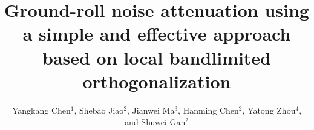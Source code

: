 \title{Ground-roll noise attenuation using a simple and effective approach based on local bandlimited orthogonalization}
\renewcommand{\thefootnote}{\fnsymbol{footnote}}
\author{Yangkang Chen$^1$, Shebao Jiao$^2$, Jianwei Ma$^3$, Hanming Chen$^2$, Yatong Zhou$^4$, and Shuwei Gan$^2$}

\address{$^1$ Jackson School of Geosciences,
The University of Texas at Austin,
University Station, Box X,
Austin, TX 78713-8924, USA,
Email: ykchen@utexas.edu \\
$^2$ State Key Laboratory of Petroleum Resources and Prospecting, 
China University of Petroleum, 
Fuxue Road 18th,
Beijing, China, 102200, 
Email: gsw19900128@126.com \& huichanming@126.com \\
$^3$ Department of Mathematics,
Harbin Institute of Technology,
Harbin, China, 
jma@hit.edu.cn \\
$^4$ School of Electronic and Information Engineering,
Hebei University of Technology,
Xiping Road No. 5340, Beichen District,
Tianjin, China, 300401,
zyt@hebut.edu.cn 
}

\maketitle

\newcommand{\dlo}[1]{}
\newcommand{\wen}[1]{#1}    


